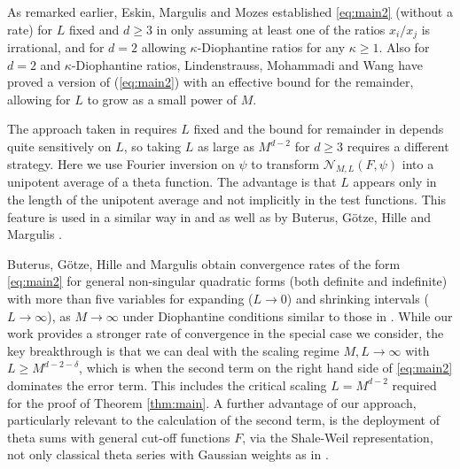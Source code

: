 \documentclass[12pt]{amsart}
\theoremstyle{definition}
\theoremstyle{remark}
\numberwithin{equation}{section}
\newcommand{\cN}{\mathcal{N}}
\begin{document}
As remarked earlier, Eskin, Margulis and Mozes established \eqref{eq:main2} (without a rate) for $L$ fixed and $d\geq 3$ in \cite{EskinMargulisMozes1998} only assuming at least one of the ratios $x_i/x_j$ is irrational, and for $d=2$ \cite{EskinMargulisMozes2005} allowing $\kappa$-Diophantine ratios for any $\kappa\geq 1$.
Also for $d = 2$ and $\kappa$-Diophantine ratios, Lindenstrauss, Mohammadi and Wang have proved a version of (\ref{eq:main2}) with an effective bound for the remainder, allowing for $L$ to grow as a small power of $M$.

The approach taken in \cite{EskinMargulisMozes2005} requires $L$ fixed and the bound for remainder in \cite{LMW2023b} depends quite sensitively on $L$, so taking $L$ as large as $M^{d-2}$ for $d \geq 3$ requires a different strategy.
Here we use Fourier inversion on $\psi$ to transform $\cN_{M,L}(F,\psi)$ into a unipotent average of a theta function.
The advantage is that $L$ appears only in the length of the unipotent average and not implicitly in the test functions.
This feature is used in a similar way in \cite{Marklof2002,Marklof2003} and as well as by Buterus, G\"otze, Hille and Margulis \cite{BGHM2022}. 

Buterus, G\"otze, Hille and Margulis \cite{BGHM2022} obtain convergence rates of the form \eqref{eq:main2} for general non-singular quadratic forms (both definite and indefinite) with more than five variables for expanding ($L\to 0$) and shrinking intervals ($L\to\infty$), as $M\to\infty$ under Diophantine conditions similar to those in \cite{EskinMargulisMozes2005}.
While our work provides a stronger rate of convergence in the special case we consider,
the key breakthrough is that we can deal with the scaling regime $M,L\to\infty$ with $L\geq M^{d-2-\delta}$, which is when the second term on the right hand side of \eqref{eq:main2} dominates the error term. This includes the critical scaling $L= M^{d-2}$ required for the proof of Theorem \ref{thm:main}.
A further advantage of our approach, particularly relevant to the calculation of the second term, is the deployment of theta sums with general cut-off functions $F$, via the Shale-Weil representation, not only classical theta series with Gaussian weights as in \cite{BGHM2022}.
\end{document}
